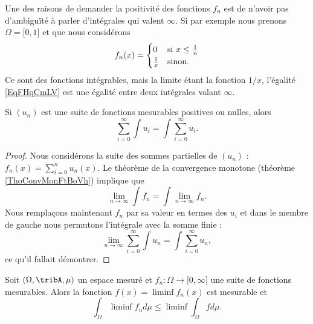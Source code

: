 \begin{remark}
    Une des raisons de demander la positivité des fonctions \( f_n\) est de n'avoir pas d'ambiguïté à parler d'intégrales qui valent \( \infty\). Si par exemple nous prenons \( \Omega=\mathopen[ 0 , 1 \mathclose]\) et que nous considérons
    \begin{equation}
        f_n(x)=\begin{cases}
            0    &   \text{si \( x\leq \frac{1}{ n }\)}\\
            \frac{1}{ x }    &    \text{sinon}.
        \end{cases}
    \end{equation}
    Ce sont des fonctions intégrables, mais la limite étant la fonction \( 1/x\), l'égalité \eqref{EqFHqCmLV} est une égalité entre deux intégrales valant \( \infty\).
\end{remark}

\begin{corollary}
    Si \( (u_n)\) est une suite de fonctions mesurables positives ou nulles, alors
    \begin{equation}
        \sum_{i=0}^{\infty}\int u_i=\int\sum_{i=0}^{\infty}u_i.
    \end{equation}
\end{corollary}

\begin{proof}
    Nous considérons la suite des sommes partielles de \( (u_n)\) : \( f_n(x)=\sum_{i=0}^nu_n(x)\). Le théorème de la convergence monotone (théorème \ref{ThoConvMonFtBoVh}) implique que
    \begin{equation}
        \lim_{n\to \infty} \int f_n=\int\lim_{n\to \infty} f_n.
    \end{equation}
    Nous remplaçons maintenant \( f_n\) par sa valeur en termes des \( u_i\) et dans le membre de gauche nous permutons l'intégrale avec la somme finie :
    \begin{equation}
        \lim_{n\to \infty} \sum_{i=0}^{\infty}\int u_n=\int\sum_{i=0}^{\infty}u_n,
    \end{equation}
    ce qu'il fallait démontrer.
\end{proof}

\begin{lemma}   \label{LemFatouUOQqyk}
    Soit \( (\Omega,\tribA,\mu)\) un espace mesuré et \( f_n\colon \Omega\to \mathopen[ 0 , \infty \mathclose]  \) une suite de fonctions mesurables. Alors la fonction \( f(x)=\liminf f_n(x)\) est mesurable et
    \begin{equation}
        \int_{\Omega}\liminf f_nd\mu\leq\liminf\int_{\Omega}fd\mu.
    \end{equation}
\end{lemma}


